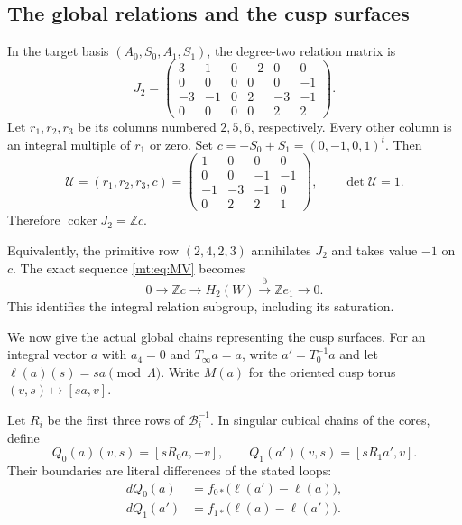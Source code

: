 \subsection{The global relations and the cusp surfaces}

In the target basis $(A_0,S_0,A_1,S_1)$, the degree-two relation matrix is
\begin{equation}\label{mt:eq:J2}
J_2=\begin{pmatrix}
3&1&0&-2&0&0\\
0&0&0&0&0&-1\\
-3&-1&0&2&-3&-1\\
0&0&0&0&2&2
\end{pmatrix}.
\end{equation}
Let $r_1,r_2,r_3$ be its columns numbered $2,5,6$, respectively.
Every other column is an integral multiple of $r_1$ or zero.
Set $c=-S_0+S_1=(0,-1,0,1)^t$.
Then
\begin{equation}\label{mt:eq:unimodular}
\mathcal U=(r_1,r_2,r_3,c)
=\begin{pmatrix}1&0&0&0\\0&0&-1&-1\\-1&-3&-1&0\\0&2&2&1\end{pmatrix},
\qquad \det\mathcal U=1.
\end{equation}
Therefore $\operatorname{coker}J_2=\mathbb Zc$.

Equivalently, the primitive row $(2,4,2,3)$ annihilates $J_2$
and takes value $-1$ on $c$.
The exact sequence \eqref{mt:eq:MV} becomes
\begin{equation}\label{mt:eq:extension}
0\longrightarrow\mathbb Zc\longrightarrow H_2(W)
\xrightarrow{\partial}\mathbb Ze_1\longrightarrow0.
\end{equation}
This identifies the integral relation subgroup, including its saturation.

We now give the actual global chains representing the cusp surfaces.
For an integral vector $a$ with $a_4=0$ and $T_\infty a=a$,
write $a'=T_0^{-1}a$ and let $\ell(a)(s)=sa\pmod\Lambda$.
Write $M(a)$ for the oriented cusp torus $(v,s)\mapsto[sa,v]$.

Let $R_i$ be the first three rows of $\mathcal B_i^{-1}$.
In singular cubical chains of the cores, define
\begin{equation}\label{mt:eq:Q}
Q_0(a)(v,s)=[sR_0a,-v],\qquad
Q_1(a')(v,s)=[sR_1a',v].
\end{equation}
Their boundaries are literal differences of the stated loops:
\begin{equation}\label{mt:eq:boundaries}
\begin{aligned}
dQ_0(a)&=f_{0*}\bigl(\ell(a')-\ell(a)\bigr),\\
dQ_1(a')&=f_{1*}\bigl(\ell(a)-\ell(a')\bigr).
\end{aligned}
\end{equation}

